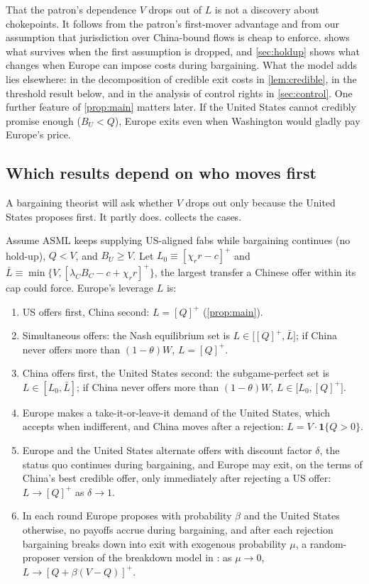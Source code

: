 That the patron's dependence $V$ drops out of $L$ is not a discovery about chokepoints. It follows from the patron's first-mover advantage and from our assumption that jurisdiction over China-bound flows is cheap to enforce.  shows what survives when the first assumption is dropped, and \cref{sec:holdup} shows what changes when Europe can impose costs during bargaining. What the model adds lies elsewhere: in the decomposition of credible exit costs in \cref{lem:credible}, in the threshold result below, and in the analysis of control rights in \cref{sec:control}. One further feature of \cref{prop:main} matters later. If the United States cannot credibly promise enough ($B_U < Q$), Europe exits even when Washington would gladly pay Europe's price.

\subsection{Which results depend on who moves first}\label{sec:protocol}

A bargaining theorist will ask whether $V$ drops out only because the United States proposes first. It partly does.  collects the cases.

\begin{proposition}\label{prop:protocol}
Assume ASML keeps supplying US-aligned fabs while bargaining continues (no hold-up), $Q < V$, and $B_U \geq V$. Let $L_0 \equiv [\chi_r r - c]^+$ and $\bar L \equiv \min\{V, [\lambda_C B_C - c + \chi_r r]^+\}$, the largest transfer a Chinese offer within its cap could force. Europe's leverage $L$ is:
\begin{enumerate}[label=(\alph*)]
\item US offers first, China second: $L = [Q]^+$ (\cref{prop:main}).
\item Simultaneous offers: the Nash equilibrium set is $L \in \big[[Q]^+, \bar L\big]$; if China never offers more than $(1-\theta)W$, $L = [Q]^+$.
\item China offers first, the United States second: the subgame-perfect set is $L \in [L_0, \bar L]$; if China never offers more than $(1-\theta)W$, $L \in \big[L_0, [Q]^+\big]$.
\item Europe makes a take-it-or-leave-it demand of the United States, which accepts when indifferent, and China moves after a rejection: $L = V\cdot\mathbf{1}\{Q>0\}$.
\item Europe and the United States alternate offers with discount factor $\delta$, the status quo continues during bargaining, and Europe may exit, on the terms of China's best credible offer, only immediately after rejecting a US offer: $L \to [Q]^+$ as $\delta \to 1$.
\item In each round Europe proposes with probability $\beta$ and the United States otherwise, no payoffs accrue during bargaining, and after each rejection bargaining breaks down into exit with exogenous probability $\mu$, a random-proposer version of the breakdown model in \citet{binmore1986nash}: as $\mu \to 0$, $L \to [Q + \beta(V-Q)]^+$.
\end{enumerate}
\end{proposition}

